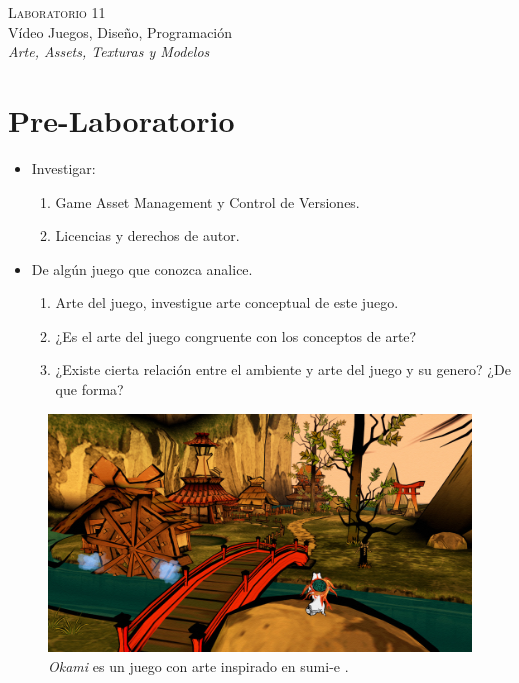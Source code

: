 \begin{center}
\textsc{\Large Laboratorio 11}~\\
{\large Vídeo Juegos, Diseño, Programación}~\\
\emph{Arte, Assets, Texturas y Modelos}
\end{center}

\section{Pre-Laboratorio}
\begin{itemize}
\item Investigar:
\begin{enumerate}
  \item Game Asset Management y Control de Versiones.
  \item Licencias y derechos de autor.
\end{enumerate}
\item De algún juego que conozca analice.
\begin{enumerate}
  \item Arte del juego, investigue arte conceptual de este juego.
  \item ¿Es el arte del juego congruente con los conceptos de arte?
  \item ¿Existe cierta relación entre el ambiente y arte del juego y su genero? ¿De que forma?
\end{enumerate}
\end{itemize}

\setlength\intextsep{0pt}
\begin{figure}
\includegraphics[width=\linewidth]{semana11/okamips2.jpg}
\caption{\emph{Okami} \cite{okami} es un juego con arte inspirado en sumi-e \cite{sumie}.}
\label{fig:particles}
\end{figure}
